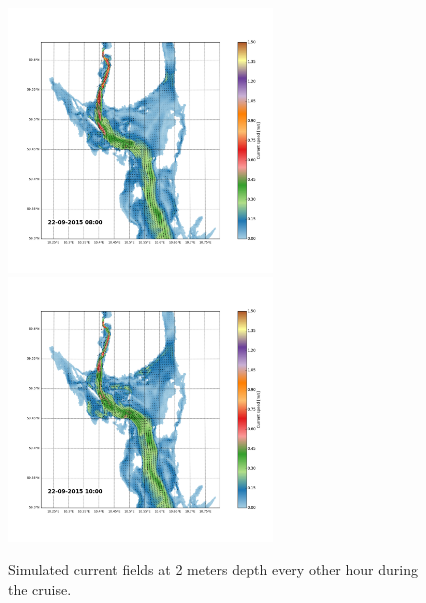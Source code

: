 \documentclass[12pt,a4paper,english]{article}
\begin{document}
\begin{figure}[h]
{}
\centerline{
\includegraphics*[trim=2.0cm 3cm 6.0cm 3.5cm,clip=true,height=7cm]{Python/stromfelt_30}
\includegraphics*[trim=3.7cm 3cm 1.3cm 3.5cm,clip=true,height=7cm]{Python/stromfelt_32}
}
\caption{\small 
Simulated current fields at 2 meters depth every other hour during the cruise.}
\label{fig:Current2}
\end{figure}
\end{document}
